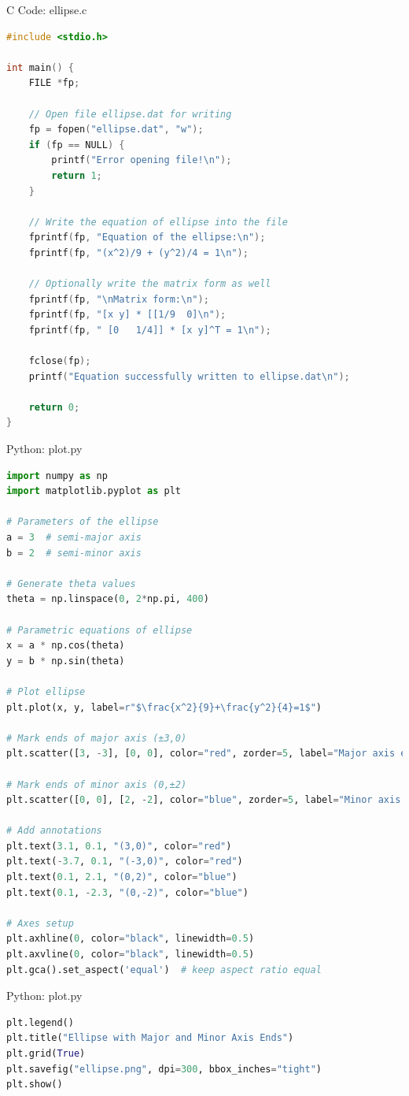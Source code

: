 \documentclass{beamer}
\numberwithin{equation}{section}
\theoremstyle{remark}
\begin{document}
\begin{frame}[fragile]{C Code: ellipse.c}
\begin{lstlisting}[language=C]
#include <stdio.h>

int main() {
    FILE *fp;

    // Open file ellipse.dat for writing
    fp = fopen("ellipse.dat", "w");
    if (fp == NULL) {
        printf("Error opening file!\n");
        return 1;
    }

    // Write the equation of ellipse into the file
    fprintf(fp, "Equation of the ellipse:\n");
    fprintf(fp, "(x^2)/9 + (y^2)/4 = 1\n");

    // Optionally write the matrix form as well
    fprintf(fp, "\nMatrix form:\n");
    fprintf(fp, "[x y] * [[1/9  0]\n");
    fprintf(fp, " [0   1/4]] * [x y]^T = 1\n");

    fclose(fp);
    printf("Equation successfully written to ellipse.dat\n");

    return 0;
}


\end{lstlisting}
\end{frame}

\begin{frame}[fragile]{Python: plot.py}
\begin{lstlisting}[language=Python]
import numpy as np
import matplotlib.pyplot as plt

# Parameters of the ellipse
a = 3  # semi-major axis
b = 2  # semi-minor axis

# Generate theta values
theta = np.linspace(0, 2*np.pi, 400)

# Parametric equations of ellipse
x = a * np.cos(theta)
y = b * np.sin(theta)

# Plot ellipse
plt.plot(x, y, label=r"$\frac{x^2}{9}+\frac{y^2}{4}=1$")

# Mark ends of major axis (±3,0)
plt.scatter([3, -3], [0, 0], color="red", zorder=5, label="Major axis ends")

# Mark ends of minor axis (0,±2)
plt.scatter([0, 0], [2, -2], color="blue", zorder=5, label="Minor axis ends")

# Add annotations
plt.text(3.1, 0.1, "(3,0)", color="red")
plt.text(-3.7, 0.1, "(-3,0)", color="red")
plt.text(0.1, 2.1, "(0,2)", color="blue")
plt.text(0.1, -2.3, "(0,-2)", color="blue")

# Axes setup
plt.axhline(0, color="black", linewidth=0.5)
plt.axvline(0, color="black", linewidth=0.5)
plt.gca().set_aspect('equal')  # keep aspect ratio equal
\end{lstlisting}
\end{frame}

\begin{frame}[fragile]{Python: plot.py}
\begin{lstlisting}[language=Python]
plt.legend()
plt.title("Ellipse with Major and Minor Axis Ends")
plt.grid(True)
plt.savefig("ellipse.png", dpi=300, bbox_inches="tight")
plt.show()


\end{lstlisting}
\end{frame} 
\end{document}
